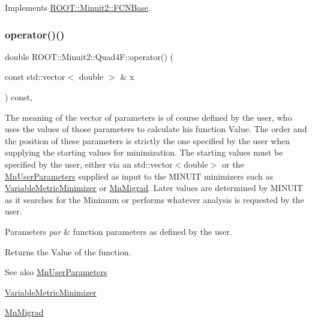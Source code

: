 Implements \mbox{\hyperlink{classROOT_1_1Minuit2_1_1FCNBase_ae4a86bd94d0d0f5ca6fc8f8ab2bb43cd}{R\+O\+O\+T\+::\+Minuit2\+::\+F\+C\+N\+Base}}.

\mbox{\label{classROOT_1_1Minuit2_1_1Quad4F_a41964a71fa65445e18c041fbdc724a03}} 
\subsubsection{\texorpdfstring{operator()()}{operator()()}\hspace{0.1cm}{\footnotesize\ttfamily [2/2]}}
{\footnotesize\ttfamily double R\+O\+O\+T\+::\+Minuit2\+::\+Quad4\+F\+::operator() (\begin{DoxyParamCaption}\item[{const std\+::vector$<$ double $>$ \&}]{x }\end{DoxyParamCaption}) const\hspace{0.3cm}{\ttfamily [inline]}, {\ttfamily [virtual]}}

The meaning of the vector of parameters is of course defined by the user, who uses the values of those parameters to calculate his function Value. The order and the position of these parameters is strictly the one specified by the user when supplying the starting values for minimization. The starting values must be specified by the user, either via an std\+::vector$<$double$>$ or the \mbox{\hyperlink{classROOT_1_1Minuit2_1_1MnUserParameters}{Mn\+User\+Parameters}} supplied as input to the M\+I\+N\+U\+IT minimizers such as \mbox{\hyperlink{classROOT_1_1Minuit2_1_1VariableMetricMinimizer}{Variable\+Metric\+Minimizer}} or \mbox{\hyperlink{classROOT_1_1Minuit2_1_1MnMigrad}{Mn\+Migrad}}. Later values are determined by M\+I\+N\+U\+IT as it searches for the Minimum or performs whatever analysis is requested by the user.


\begin{DoxyParams}{Parameters}
{\em par} & function parameters as defined by the user.\\
\hline
\end{DoxyParams}
\begin{DoxyReturn}{Returns}
the Value of the function.
\end{DoxyReturn}
\begin{DoxySeeAlso}{See also}
\mbox{\hyperlink{classROOT_1_1Minuit2_1_1MnUserParameters}{Mn\+User\+Parameters}} 

\mbox{\hyperlink{classROOT_1_1Minuit2_1_1VariableMetricMinimizer}{Variable\+Metric\+Minimizer}} 

\mbox{\hyperlink{classROOT_1_1Minuit2_1_1MnMigrad}{Mn\+Migrad}} 
\end{DoxySeeAlso}


